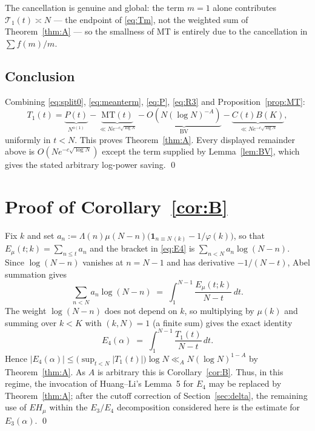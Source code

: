 \documentclass[11pt,a4paper]{article}
\theoremstyle{plain}
\theoremstyle{definition}
\theoremstyle{remark}
\newcommand{\Emu}{E_\mu}
\newcommand{\Tcut}{\mathcal T}
\begin{document}
The cancellation is genuine and global: the term $m=1$ alone
contributes $\Tcut_1(t)\asymp N$ --- the endpoint of \eqref{eq:Tm}, not
the weighted sum of Theorem~\ref{thm:A} --- so the smallness of
$\mathrm{MT}$ is
entirely due to the cancellation in $\sum f(m)/m$.

\subsection{Conclusion}

Combining \eqref{eq:split0}, \eqref{eq:meanterm}, \eqref{eq:P},
\eqref{eq:R3} and Proposition~\ref{prop:MT}:
\[
  T_1(t)=\underbrace{P(t)}_{N^{o(1)}}
         -\underbrace{\mathrm{MT}(t)}_{\ll Ne^{-c\sqrt{\log N}}}
         -\underbrace{O\!\left(N(\log N)^{-A}\right)}_{\text{BV}}
         -\underbrace{C(t)B(K)}_{\ll Ne^{-c\sqrt{\log N}}},
\]
uniformly in $t<N$. This proves Theorem~\ref{thm:A}.  Every displayed remainder above is
$O(Ne^{-c\sqrt{\log N}})$ except the term supplied by
Lemma~\ref{lem:BV}, which gives the stated arbitrary log-power saving.
\qed

\section{Proof of \texorpdfstring{Corollary~\ref{cor:B}}{the corollary}}

Fix $k$ and set
$a_n:=\Lambda(n)\mu(N-n)\bigl(\mathbf 1_{n\equiv N\,(k)}-1/\varphi(k)\bigr)$,
so that $\Emu(t;k)=\sum_{n\le t}a_n$ and the bracket in \eqref{eq:E4}
is $\sum_{n<N}a_n\log(N-n)$. Since $\log(N-n)$ vanishes at $n=N-1$ and
has derivative $-1/(N-t)$, Abel summation gives
\[
  \sum_{n<N}a_n\log(N-n)\;=\;\int_{1}^{N-1}\frac{\Emu(t;k)}{N-t}\,dt .
\]
The weight $\log(N-n)$ does not depend on $k$, so multiplying by
$\mu(k)$ and summing over $k<K$ with $(k,N)=1$ (a finite sum) gives
the exact identity
\[
  E_4(\alpha)\;=\;\int_{1}^{N-1}\frac{T_1(t)}{N-t}\,dt .
\]
Hence $|E_4(\alpha)|\le\bigl(\sup_{t<N}|T_1(t)|\bigr)\log N
\ll_A N(\log N)^{1-A}$ by Theorem~\ref{thm:A}. As $A$ is arbitrary
this is Corollary~\ref{cor:B}.  Thus, in this regime, the invocation
of Huang--Li's Lemma~5 for $E_4$ may be replaced by Theorem~\ref{thm:A};
after the cutoff correction of Section~\ref{sec:delta}, the remaining
use of $EH_\mu$ within the $E_3/E_4$ decomposition considered here is
the estimate for $E_3(\alpha)$. \qed

\end{document}
